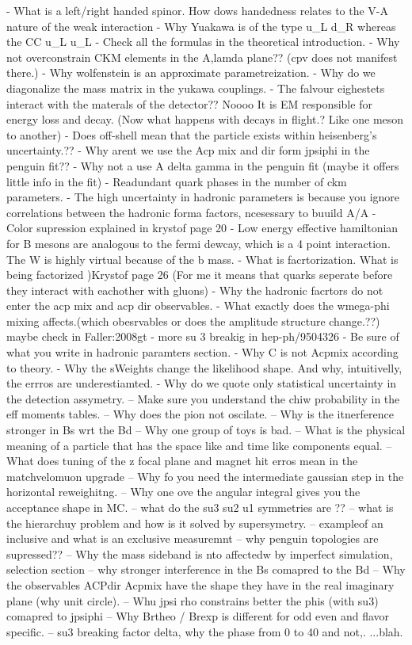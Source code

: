 - What is a left/right handed spinor. How dows handedness relates to the V-A nature of the weak interaction
- Why Yuakawa is of the type u_L d_R whereas the CC u_L u_L
- Check all the formulas in the theoretical introduction.
- Why not overconstrain CKM elements in the A,lamda plane?? (cpv does not manifest there.)
- Why wolfenstein is an approximate parametreization.
- Why do we diagonalize the mass matrix in the yukawa couplings.
- The falvour eighestets interact with the materals of the detector?? Noooo
  It is EM responsible for energy loss and decay. (Now what happens with decays in flight.? Like one meson to another)
- Does off-shell mean that the particle exists within heisenberg's uncertainty.??
- Why arent we use the Acp mix and dir form jpsiphi in the penguin fit??
- Why not a use A delta gamma in the penguin fit (maybe it offers little info in the fit)
- Readundant quark phases in the number of ckm parameters.
- The high uncertainty in hadronic parameters is because you ignore correlations between the hadronic forma factors, ncesessary to buuild A/A
- Color supression  explained in krystof page 20
- Low energy effective hamiltonian for B mesons are analogous to the fermi dewcay, which is a 4 point interaction. The W is highly virtual because of the b mass.
- What is facrtorization. What is being factorized )Krystof page 26 (For me it means that quarks seperate before they interact with eachother with gluons)
- Why the hadronic facrtors do not enter the acp mix and acp dir observables.
- What exactly does the wmega-phi mixing affects.(which obesrvables or does the amplitude structure change.??)  maybe check in  {Faller:2008gt}
- more su 3 breakig in hep-ph/9504326
- Be sure of what you write in hadronic paramters section.
- Why C is not Acpmix according to theory.
- Why the sWeights change the likelihood shape. And why, intuitivelly, the errros are underestiamted.
- Why do we quote only statistical uncertainty in the detection assymetry.
-- Make sure you understand the chiw probability in the eff moments tables.
-- Why does the pion not oscilate.
-- Why is the itnerference stronger in Bs wrt the Bd
-- Why one group of toys is bad.
-- What is the physical meaning of a particle that has the space like and time like components equal.
-- What does tuning of the z focal plane and magnet hit erros mean in the matchvelomuon upgrade
-- Why fo you need the intermediate gaussian step in the horizontal reweighitng.
-- Why one ove the angular \pdf integral gives you the acceptance shape in MC.
-- what do the su3 su2 u1 symmetries are ??
-- what is the hierarchuy problem and how is it solved by supersymetry.
-- exampleof an inclusive and what is an exclusive measuremnt
-- why penguin topologies are supressed??
-- Why the mass sideband is nto affectedw by imperfect simulation, selection section
-- why stronger interference in the Bs comapred to the Bd
-- Why the observables ACPdir Acpmix have the shape they have in the real imaginary plane (why unit circle).
-- Whu jpsi rho constrains better the phis (with su3) comapred to jpsiphi
-- Why Brtheo / Brexp is different for odd even and flavor specific.
-- su3 breaking factor delta, why the phase from 0 to 40 and not,. ...blah.


